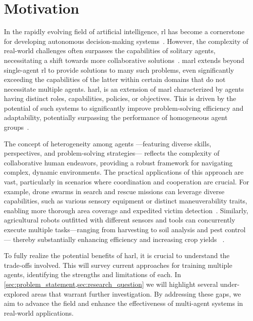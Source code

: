 \section{Motivation}%
\label{sec:motivation}

In the rapidly evolving field of artificial intelligence, \gls{rl} has become a 
cornerstone for developing autonomous decision-making systems~\cite{sutton2018}.
However, the complexity of real-world challenges often surpasses the capabilities of solitary 
agents, necessitating a shift towards more collaborative solutions~\cite{cao2012}.
\Gls{marl} extends beyond single-agent \gls{rl} to provide solutions to many such problems,
even significantly exceeding the capabilities of the latter 
within certain domains that do not necessitate multiple agents. \Gls{harl}, is an extension of 
\gls{marl} characterized by agents having distinct roles, capabilities, policies, or objectives.
This \printdoctype is driven by the potential of such systems
to significantly improve problem-solving efficiency and adaptability, 
potentially surpassing the performance of homogeneous agent groups~\cite{calvo2018}.

The concept of heterogeneity among agents
—featuring diverse skills, perspectives, and problem-solving strategies—
reflects the complexity of collaborative human endeavors, 
providing a robust framework for navigating complex, dynamic environments. 
The practical applications of this approach are vast, 
particularly in scenarios where coordination and cooperation are crucial. 
For example, drone swarms in search and rescue missions can leverage diverse capabilities, 
such as various sensory equipment or distinct maneuverability traits, 
enabling more thorough area coverage and expedited victim detection~\cite{hoang2023,kouzeghar2023}.
Similarly, agricultural robots outfitted with different sensors and tools can concurrently 
execute multiple tasks—ranging from harvesting to soil analysis and pest control—
thereby substantially enhancing efficiency and increasing crop yields~%
\cite{carbone2018,amarasinghe2019}.

To fully realize the potential benefits of \gls{harl}, it is crucial to understand the trade-offs 
involved. This \printdoctype will survey current approaches for training multiple agents, 
identifying the strengths and limitations of each. 
In \cref{sec:problem_statement,sec:research_question}
we will highlight several under-explored areas that warrant further investigation. 
By addressing these gaps, we aim to advance the field and enhance the effectiveness of 
multi-agent systems in real-world applications.

